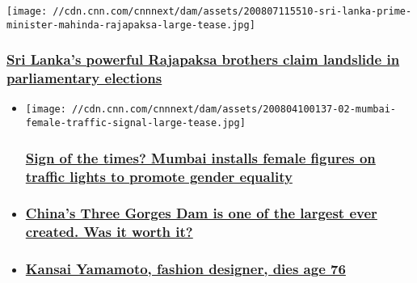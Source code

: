 \href{/2020/08/07/asia/sri-lanka-election-mahinda-rajapaksa-intl-hnk/index.html}{}

\texttt{[image: //cdn.cnn.com/cnnnext/dam/assets/200807115510-sri-lanka-prime-minister-mahinda-rajapaksa-large-tease.jpg]}

\hypertarget{sri-lankas-powerful-rajapaksa-brothers-claim-landslide-in-parliamentary-elections}{%
\subsubsection{\texorpdfstring{\href{/2020/08/07/asia/sri-lanka-election-mahinda-rajapaksa-intl-hnk/index.html}{Sri
Lanka's powerful Rajapaksa brothers claim landslide in parliamentary
elections}}{Sri Lanka's powerful Rajapaksa brothers claim landslide in parliamentary elections}}\label{sri-lankas-powerful-rajapaksa-brothers-claim-landslide-in-parliamentary-elections}}

\begin{itemize}
\item
  \href{/style/article/mumbai-traffic-light-women-intl-hnk-scli/index.html}{}

  \texttt{[image: //cdn.cnn.com/cnnnext/dam/assets/200804100137-02-mumbai-female-traffic-signal-large-tease.jpg]}

  \hypertarget{sign-of-the-times-mumbai-installs-female-figures-on-traffic-lights-to-promote-gender-equality}{%
  \subsubsection{\texorpdfstring{\href{/style/article/mumbai-traffic-light-women-intl-hnk-scli/index.html}{Sign
  of the times? Mumbai installs female figures on traffic lights to
  promote gender
  equality}}{Sign of the times? Mumbai installs female figures on traffic lights to promote gender equality}}\label{sign-of-the-times-mumbai-installs-female-figures-on-traffic-lights-to-promote-gender-equality}}
\item
  \hypertarget{chinas-three-gorges-dam-is-one-of-the-largest-ever-created-was-it-worth-it}{%
  \subsubsection{\texorpdfstring{\href{/style/article/china-three-gorges-dam-intl-hnk-dst/index.html}{China's
  Three Gorges Dam is one of the largest ever created. Was it worth
  it?}}{China's Three Gorges Dam is one of the largest ever created. Was it worth it?}}\label{chinas-three-gorges-dam-is-one-of-the-largest-ever-created-was-it-worth-it}}
\item
  \hypertarget{kansai-yamamoto-fashion-designer-dies-age-76}{%
  \subsubsection{\texorpdfstring{\href{/style/article/kansai-yamamoto-fashion-designer/index.html}{Kansai
  Yamamoto, fashion designer, dies age
  76}}{Kansai Yamamoto, fashion designer, dies age 76}}\label{kansai-yamamoto-fashion-designer-dies-age-76}}
\end{itemize}

